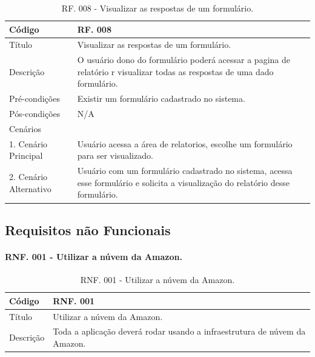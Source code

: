 \documentclass[11pt]{article}
\begin{document}
      \begin{table}[h]
        \begin{center}
          \begin{tabular}{ | p{5cm} | p{10cm} | }
            \hline
            Código\cellcolor{gray} & RF. 008\cellcolor{gray} \\
            \hline
            Título & Visualizar as respostas de um formulário. \\
            \hline
            Descrição & O usuário dono do formulário poderá acessar a pagina de relatório r visualizar todas as respostas de uma dado formulário. \\
            \hline
            Pré-condições & Existir um formulário cadastrado no sistema. \\
            \hline
            Pós-condições & N/A \\
            \hline
            Cenários &   \\
            \hline
            1.  Cenário Principal & Usuário acessa a área de relatorios, escolhe um formulário para ser visualizado. \\
            \hline
            2.  Cenário Alternativo & Usuário com um formulário cadastrado no sistema, acessa esse formulário e solicita a visualização do relatório desse formulário. \\
            \hline
          \end{tabular}
          \caption{RF. 008 - Visualizar as respostas de um formulário.}
        \end{center}
      \end{table}

    \subsection{Requisitos não Funcionais}
    
      \paragraph{RNF. 001 - Utilizar a núvem da Amazon.} \hspace{10pt}

      \begin{table}[h]
        \begin{center}
          \begin{tabular}{ | p{5cm} | p{10cm} | }
            \hline
            Código\cellcolor{gray} & RNF. 001\cellcolor{gray} \\
            \hline
            Título & Utilizar a núvem da Amazon. \\
            \hline
            Descrição & Toda a aplicação deverá rodar usando a infraestrutura de núvem da Amazon. \\
            \hline
          \end{tabular}
          \caption{RNF. 001 - Utilizar a núvem da Amazon.}
        \end{center}
      \end{table}
\end{document}
